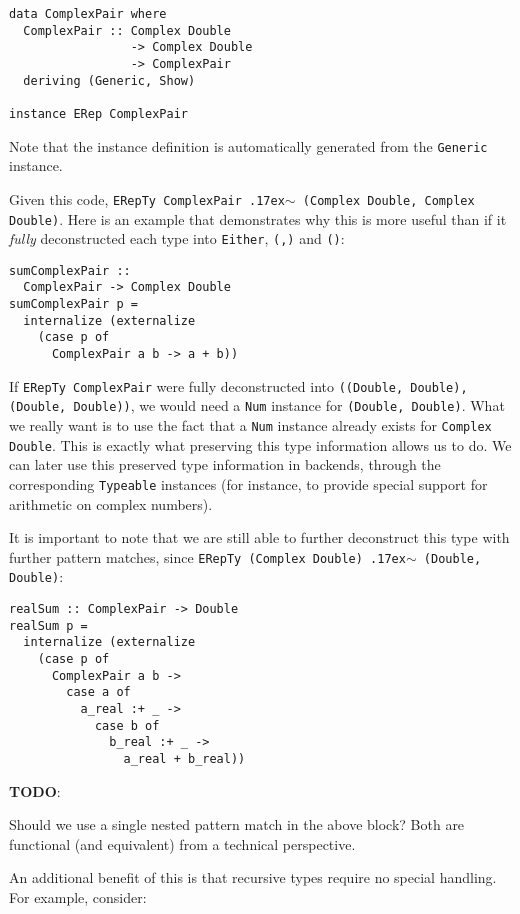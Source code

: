 \documentclass[sigplan,anonymous,review]{acmart}
\newcommand{\typeeq}{\raise.17ex\hbox{$\scriptstyle\mathtt{\sim}$}\,\;}
\newcommand{\ttt}{\texttt}
\newenvironment{todo}
  {\begin{tcolorbox}
   \textbf{TODO}:
  }
  {\end{tcolorbox}
  }
\begin{document}
\begin{lstlisting}
data ComplexPair where
  ComplexPair :: Complex Double
                 -> Complex Double
                 -> ComplexPair
  deriving (Generic, Show)

instance ERep ComplexPair
\end{lstlisting}

Note that the instance definition is automatically generated from the
\ttt{Generic} instance.

Given this code, \ttt{ERepTy ComplexPair \typeeq (Complex Double, Complex Double)}. Here
is an example that demonstrates why this is more useful than if it \textit{fully} deconstructed
each type into \ttt{Either}, \ttt{(,)} and \ttt{()}:

\begin{lstlisting}
sumComplexPair ::
  ComplexPair -> Complex Double
sumComplexPair p =
  internalize (externalize
    (case p of
      ComplexPair a b -> a + b))
\end{lstlisting}

If \ttt{ERepTy ComplexPair} were fully deconstructed into \ttt{((Double, Double),
(Double, Double))}, we would need a \ttt{Num} instance for \ttt{(Double,
Double)}.  What we really want is to use the fact that a \ttt{Num} instance
already exists for \ttt{Complex Double}. This is exactly what preserving this
type information allows us to do. We can later use this preserved type
information in backends, through the corresponding \ttt{Typeable} instances (for
instance, to provide special support for arithmetic on complex numbers).

It is important to note that we are still able to further deconstruct this type
with further pattern matches, since \ttt{ERepTy (Complex Double) \typeeq (Double, Double)}:

\begin{lstlisting}
realSum :: ComplexPair -> Double
realSum p =
  internalize (externalize
    (case p of
      ComplexPair a b ->
        case a of
          a_real :+ _ ->
            case b of
              b_real :+ _ ->
                a_real + b_real))
\end{lstlisting}

\begin{todo}
  Should we use a single nested pattern match in the above block? Both
  are functional (and equivalent) from a technical perspective.
\end{todo}

An additional benefit of this is that recursive types require no special handling. For
example, consider:
\end{document}
